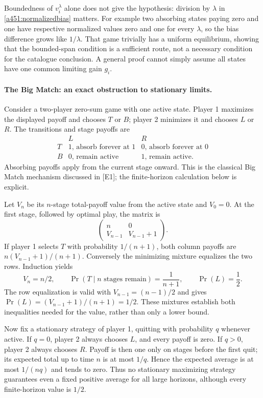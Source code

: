 \documentclass[11pt]{article}
\begin{document}
Boundedness of $v_i^\lambda$ alone does not give the hypothesis: division
by $\lambda$ in \eqref{a451:normalizedbias} matters. For example two
absorbing states paying zero and one have respective normalized values
zero and one for every $\lambda$, so the bias difference grows like
$1/\lambda$. That game trivially has a uniform equilibrium, showing that
the bounded-span condition is a sufficient route, not a necessary
condition for the catalogue conclusion. A general proof cannot simply
assume all states have one common limiting gain $g_i$.

\paragraph{The Big Match: an exact obstruction to stationary limits.}
Consider a two-player zero-sum game with one active state. Player 1
maximizes the displayed payoff and chooses $T$ or $B$; player 2 minimizes
it and chooses $L$ or $R$. The transitions and stage payoffs are
\[
 \begin{array}{c|cc}
       &L&R\\\hline
 T&1\text{, absorb forever at }1&0\text{, absorb forever at }0\\
 B&0\text{, remain active}&1\text{, remain active}.
 \end{array}
\]
Absorbing payoffs apply from the current stage onward. This is the
classical Big Match mechanism discussed in [E1]; the finite-horizon
calculation below is explicit.

Let $V_n$ be its $n$-stage total-payoff value from the active state and
$V_0=0$. At the first stage, followed by optimal play, the matrix is
\[
 \begin{pmatrix}n&0\\V_{n-1}&V_{n-1}+1\end{pmatrix}.
\]
If player 1 selects $T$ with probability $1/(n+1)$, both column payoffs
are $n(V_{n-1}+1)/(n+1)$. Conversely the minimizing mixture equalizes
the two rows. Induction yields
\begin{equation}\label{a451:bigmatchvalue}
 V_n=n/2,
 \qquad\Pr(T\mid n\text{ stages remain})=\frac1{n+1},
 \qquad\Pr(L)=\frac12.
\end{equation}
The row equalization is valid with $V_{n-1}=(n-1)/2$ and gives
$\Pr(L)=(V_{n-1}+1)/(n+1)=1/2$. These mixtures establish both
inequalities needed for the value, rather than only a lower bound.

Now fix a stationary strategy of player 1, quitting with probability
$q$ whenever active. If $q=0$, player 2 always chooses $L$, and every
payoff is zero. If $q>0$, player 2 always chooses $R$. Payoff is then
one only on stages before the first quit; its expected total up to time
$n$ is at most $1/q$. Hence the expected average is at most $1/(nq)$
and tends to zero. Thus no stationary maximizing strategy guarantees
even a fixed positive average for all large horizons, although every
finite-horizon value is $1/2$.
\end{document}
